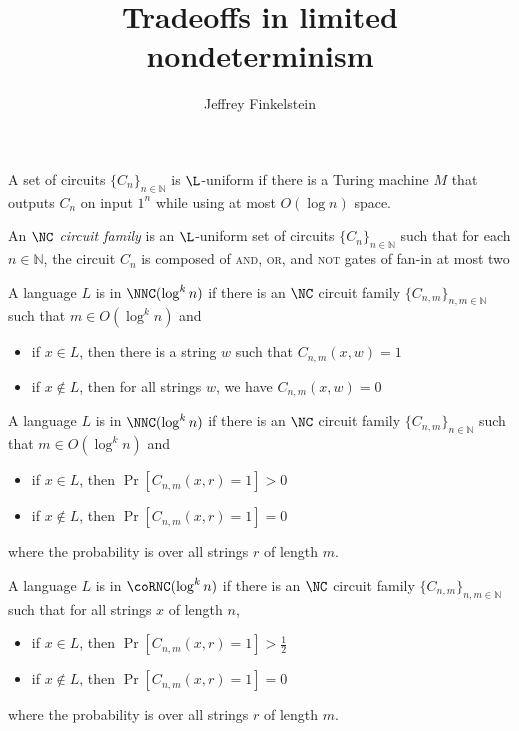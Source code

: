 \documentclass{article}
\title{Tradeoffs in limited nondeterminism}
\author{Jeffrey Finkelstein}
\begin{document}
\maketitle

\begin{definition}
  A set of circuits $\{C_n\}_{n \in \mathbb{N}}$ is $\L$-uniform if there is a Turing machine $M$ that outputs $C_n$ on input $1^n$ while using at most $O(\log n)$ space.
\end{definition}

\begin{definition}
  An \emph{$\NC$ circuit family} is an $\L$-uniform set of circuits $\{C_n\}_{n \in \mathbb{N}}$ such that for each $n \in \mathbb{N}$, the circuit $C_n$ is composed of \textsc{and}, \textsc{or}, and \textsc{not} gates of fan-in at most two
\end{definition}

\begin{definition}
  A language $L$ is in $\NNC(\log^k n)$ if there is an $\NC$ circuit family $\{C_{n, m}\}_{n, m \in \mathbb{N}}$ such that $m \in O(\log^k n)$ and
  \begin{itemize}
  \item if $x \in L$, then there is a string $w$ such that $C_{n, m}(x, w) = 1$
  \item if $x \notin L$, then for all strings $w$, we have $C_{n, m}(x, w) = 0$
  \end{itemize}
\end{definition}

\begin{definition}
  A language $L$ is in $\NNC(\log^k n)$ if there is an $\NC$ circuit family $\{C_{n, m}\}_{n \in \mathbb{N}}$ such that $m \in O(\log^k n)$ and
  \begin{itemize}
  \item if $x \in L$, then $\Pr[C_{n, m}(x, r) = 1] > 0$
  \item if $x \notin L$, then $\Pr[C_{n, m}(x, r) = 1] = 0$
  \end{itemize}
  where the probability is over all strings $r$ of length $m$.
\end{definition}

\begin{definition}
  A language $L$ is in $\coRNC(\log^k n)$ if there is an $\NC$ circuit family $\{C_{n, m}\}_{n, m \in \mathbb{N}}$ such that for all strings $x$ of length $n$,
  \begin{itemize}
  \item if $x \in L$, then $\Pr[C_{n, m}(x, r) = 1] > \frac{1}{2}$
  \item if $x \notin L$, then $\Pr[C_{n, m}(x, r) = 1] = 0$
  \end{itemize}
  where the probability is over all strings $r$ of length $m$.
\end{definition}
\end{document}
